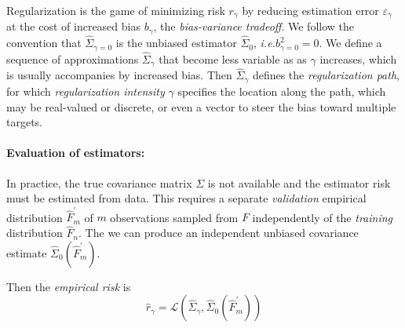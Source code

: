 Regularization is the game of minimizing risk $r_\gamma$ by reducing estimation error $\varepsilon_\gamma$ at the cost of increased bias $b_\gamma$, the \emph{bias-variance tradeoff}.  
We follow the convention that $\hat\Sigma_{\gamma=0}$ is the unbiased estimator $\hat\Sigma_0$, \emph{i.e.}\;$b_{\gamma=0}^2 = 0$. 
We define a sequence of approximations $\hat\Sigma_\gamma$ that become less variable as as $\gamma$ increases, which is usually accompanies by increased bias. Then $\hat\Sigma_\gamma$ defines the \emph{regularization path}, for which \emph{regularization intensity} $\gamma$ specifies the location along the path, which may be real-valued or discrete, or even a vector to steer the bias toward multiple targets.  


\paragraph{Evaluation of estimators:}

In practice, the true covariance matrix $\Sigma$ is not available and the estimator risk must be estimated from data. This requires a separate \emph{validation} empirical distribution $\hat F_m^\prime$ of $m$ observations sampled from $F$ independently of the \emph{training} distribution $\hat F_n$. The we can produce an independent unbiased covariance estimate $\hat \Sigma_0(\hat F_m^\prime)$.

Then the \emph{empirical risk} is 
\begin{equation}
\hat r_\gamma = \mathcal L\left(\hat\Sigma_\gamma,\hat\Sigma_0(\hat F_m^\prime)\right) 
\end{equation}

